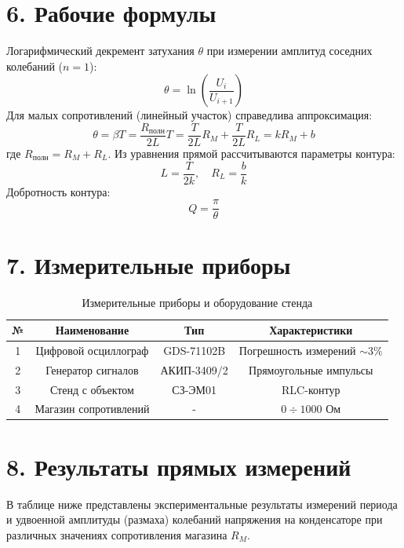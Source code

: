 \documentclass[a4paper,12pt]{article}
\begin{document}
\section*{\hspace{30pt}6. Рабочие формулы}
\hspace{15pt} Логарифмический декремент затухания $\theta$ при измерении амплитуд соседних колебаний ($n=1$):
\begin{equation}
    \theta = \ln\left(\frac{U_i}{U_{i+1}}\right)
    \label{eq:theta}
\end{equation}
Для малых сопротивлений (линейный участок) справедлива аппроксимация:
\begin{equation}
    \theta = \beta T = \frac{R_{\text{полн}}}{2L} T = \frac{T}{2L} R_M + \frac{T}{2L} R_L = k R_M + b
    \label{eq:linear}
\end{equation}
где $R_{\text{полн}} = R_M + R_L$. Из уравнения прямой рассчитываются параметры контура:
\begin{equation}
    L = \frac{T}{2k}, \quad R_L = \frac{b}{k}
    \label{eq:L_R}
\end{equation}
Добротность контура:
\begin{equation}
    Q = \frac{\pi}{\theta}
    \label{eq:Q}
\end{equation}

\section*{\hspace{30pt}7. Измерительные приборы}
\begin{table}[H]
    \caption{Измерительные приборы и оборудование стенда}
    \label{tab:devices}
    \centering
    \begin{tabular}{|c|c|c|c|}
        \hline
        № & Наименование & Тип & Характеристики \\ \hline
        1 & Цифровой осциллограф & GDS-71102B & Погрешность измерений $\sim 3\%$ \\ \hline
        2 & Генератор сигналов & АКИП-3409/2 & Прямоугольные импульсы \\ \hline
        3 & Стенд с объектом & СЗ-ЭМ01 & RLC-контур \\ \hline
        4 & Магазин сопротивлений & - & $0 \div 1000$ Ом \\ \hline
    \end{tabular}
\end{table}

\section*{\hspace{30pt}8. Результаты прямых измерений}
\hspace{15pt} В таблице ниже представлены экспериментальные результаты измерений периода и удвоенной амплитуды (размаха) колебаний напряжения на конденсаторе при различных значениях сопротивления магазина $R_M$.
\end{document}
